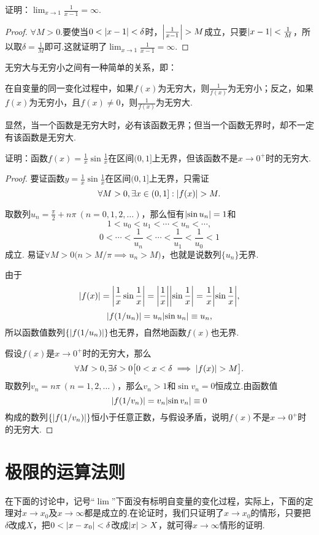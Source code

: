 \begin{example}
证明：\(\lim_{x\to1}\frac{1}{x-1}=\infty\).
\begin{proof}
\(\forall M>0\).要使当\(0<\abs{x-1}<\delta\)时，\(\abs{\frac{1}{x-1}}>M\)成立，只要\(\abs{x-1}<\frac{1}{M}\)，所以取\(\delta=\frac{1}{M}\)即可.这就证明了\(\lim_{x\to1}\frac{1}{x-1}=\infty\).
\end{proof}
\end{example}

无穷大与无穷小之间有一种简单的关系，即：
\begin{theorem}\label{theorem:极限.无穷大与无穷小的关系}
在自变量的同一变化过程中，如果\(f(x)\)为无穷大，则\(\frac{1}{f(x)}\)为无穷小；反之，如果\(f(x)\)为无穷小，且\(f(x) \neq 0\)，则\(\frac{1}{f(x)}\)为无穷大.
\end{theorem}

显然，当一个函数是无穷大时，必有该函数无界；但当一个函数无界时，却不一定有该函数是无穷大.
\begin{example}
证明：函数\(f(x) = \frac{1}{x} \sin\frac{1}{x}\)在区间\((0,1]\)上无界，但该函数不是\(x\to0^+\)时的无穷大.
\begin{proof}
要证函数\(y = \frac{1}{x} \sin\frac{1}{x}\)在区间\((0,1]\)上无界，只需证\[
\forall M > 0, \exists x \in (0,1] : \abs{f(x)} > M.
\]

取数列\(u_n = \frac{\pi}{2} + n\pi\ (n=0,1,2,\dotsc)\)，那么恒有\(\abs{\sin u_n} = 1\)和\[
1 < u_0 < u_1 < \dotsb < u_n < \dotsb,
\]\[
0 < \dotsb < \frac{1}{u_n} < \dotsb < \frac{1}{u_1} < \frac{1}{u_0} < 1
\]成立.
易证\(
\forall M > 0 \bigl(
	n > M/\pi \implies u_n > M
\bigr)
\)，也就是说数列\(\{u_n\}\)无界.

由于\[
\abs{f(x)} = \abs{\frac{1}{x} \sin\frac{1}{x}}
= \abs{\frac{1}{x}} \abs{\sin\frac{1}{x}}
= \frac{1}{x} \abs{\sin\frac{1}{x}},
\]\[
\abs{f(1/u_n)}
= u_n \abs{\sin u_n} \equiv u_n,
\]所以函数值数列\(\{\abs{f(1/u_n)}\}\)也无界，自然地函数\(f(x)\)也无界.


假设\(f(x)\)是\(x\to0^+\)时的无穷大，那么\[
\forall M > 0, \exists \delta > 0 \bigl[
0 < x < \delta \implies \abs{f(x)} > M
\bigr].
\]取数列\(v_n = n\pi\ (n=1,2,\dotsc)\)，那么\(v_n > 1\)和\(\sin v_n = 0\)恒成立.由函数值\[
\abs{f(1/v_n)} = v_n \abs{\sin v_n} \equiv 0
\]构成的数列\(\{\abs{f(1/v_n)}\}\)恒小于任意正数，与假设矛盾，说明\(f(x)\)不是\(x\to0^+\)时的无穷大.
\end{proof}
\end{example}

\section{极限的运算法则}\label{section:极限.极限的运算法则}
在下面的讨论中，记号“\(\lim\)”下面没有标明自变量的变化过程，实际上，下面的定理对\(x \to x_0\)及\(x \to \infty\)都是成立的.在论证时，我们只证明了\(x \to x_0\)的情形，只要把\(\delta\)改成\(X\)，把\(0<\abs{x-x_0}<\delta\)改成\(\abs{x}>X\)，就可得\(x \to \infty\)情形的证明.

